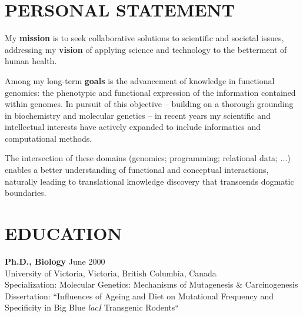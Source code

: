 \documentclass[margin]{res} %
\begin{document}
\begin{resume}

\iffalse comment
out
this text\fi


{\color{blue}\section{PERSONAL STATEMENT}}

My \textbf{mission} is to seek collaborative solutions to scientific and societal issues, addressing my \textbf{vision} of applying science and technology to the betterment of human health.

Among my long-term \textbf{goals} is the advancement of knowledge in functional genomics: the phenotypic and functional expression of the information contained within genomes.  In pursuit of this objective -- building on a thorough grounding in biochemistry and molecular genetics -- in recent years my scientific and intellectual interests have actively expanded to include informatics and computational methods.

The intersection of these domains (genomics; programming; relational data; ...) enables a better understanding of functional and conceptual interactions, naturally leading to translational knowledge discovery that transcends dogmatic boundaries.


{\color{blue}\section{EDUCATION}}

\textbf{Ph.D., Biology} \hfill June 2000\vspace{0.1 cm}\\
University of Victoria, Victoria, British Columbia, Canada\\
Specialization: Molecular Genetics: Mechanisms of Mutagenesis \& Carcinogenesis \\
Dissertation: ``Influences of Ageing and Diet on Mutational Frequency and Specificity in Big Blue\textsuperscript{\textregistered} \textit{lacI} Transgenic Rodents``


\end{resume}
\end{document}
